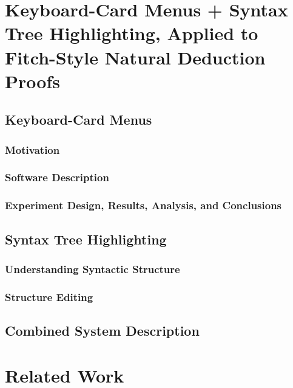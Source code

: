 \documentclass[phd,appendix]{uithesis}
\begin{document}
\chapter{Keyboard-Card Menus + Syntax Tree Highlighting, Applied to Fitch-Style Natural Deduction Proofs}
\label{chapter:kcmsth}

\section{Keyboard-Card Menus}

  \subsection{Motivation}

  \subsection{Software Description}

  \subsection{Experiment Design, Results, Analysis, and Conclusions}

\section{Syntax Tree Highlighting}

  \subsection{Understanding Syntactic Structure}

  \subsection{Structure Editing}
  
\section{Combined System Description}


\chapter{Related Work}
\label{chapter:relatedwork}
\end{document}
